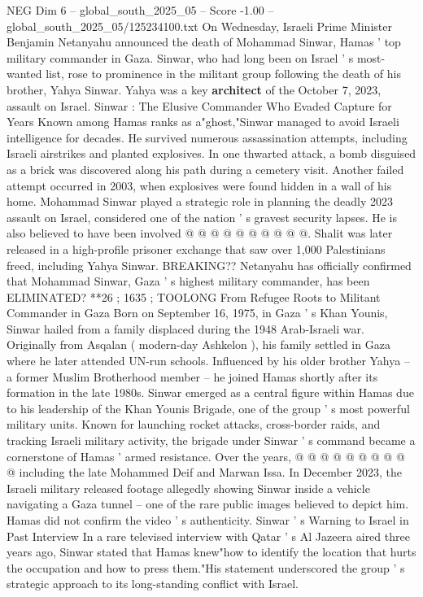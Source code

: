 \begin{textsample}{NEG Dim 6 – global\_south\_2025\_05 – Score -1.00 – global\_south\_2025\_05/125234100.txt}  \label{ex:f6_neg_386}
On Wednesday, Israeli Prime Minister Benjamin Netanyahu announced the death of Mohammad Sinwar, Hamas ' top military commander in Gaza.
Sinwar, who had long been on Israel ' s most-wanted list, rose to prominence in the militant group following the death of his brother, Yahya Sinwar.
Yahya was a key \textbf{architect} of the October 7, 2023, assault on Israel.
Sinwar : The Elusive Commander Who Evaded Capture for Years Known among Hamas ranks as a"ghost,"Sinwar managed to avoid Israeli intelligence for decades.
He survived numerous assassination attempts, including Israeli airstrikes and planted explosives.
In one thwarted attack, a bomb disguised as a brick was discovered along his path during a cemetery visit.
Another failed attempt occurred in 2003, when explosives were found hidden in a wall of his home.
Mohammad Sinwar played a strategic role in planning the deadly 2023 assault on Israel, considered one of the nation ' s gravest security lapses.
He is also believed to have been involved @ @ @ @ @ @ @ @ @ @.
Shalit was later released in a high-profile prisoner exchange that saw over 1,000 Palestinians freed, including Yahya Sinwar.
BREAKING??
Netanyahu has officially confirmed that Mohammad Sinwar, Gaza ' s highest military commander, has been ELIMINATED? **26 ; 1635 ; TOOLONG From Refugee Roots to Militant Commander in Gaza Born on September 16, 1975, in Gaza ' s Khan Younis, Sinwar hailed from a family displaced during the 1948 Arab-Israeli war.
Originally from Asqalan ( modern-day Ashkelon ), his family settled in Gaza where he later attended UN-run schools.
Influenced by his older brother Yahya -- a former Muslim Brotherhood member -- he joined Hamas shortly after its formation in the late 1980s.
Sinwar emerged as a central figure within Hamas due to his leadership of the Khan Younis Brigade, one of the group ' s most powerful military units.
Known for launching rocket attacks, cross-border raids, and tracking Israeli military activity, the brigade under Sinwar ' s command became a cornerstone of Hamas ' armed resistance.
Over the years, @ @ @ @ @ @ @ @ @ @ including the late Mohammed Deif and Marwan Issa.
In December 2023, the Israeli military released footage allegedly showing Sinwar inside a vehicle navigating a Gaza tunnel -- one of the rare public images believed to depict him.
Hamas did not confirm the video ' s authenticity.
Sinwar ' s Warning to Israel in Past Interview In a rare televised interview with Qatar ' s Al Jazeera aired three years ago, Sinwar stated that Hamas knew"how to identify the location that hurts the occupation and how to press them."His statement underscored the group ' s strategic approach to its long-standing conflict with Israel.

\end{textsample}
